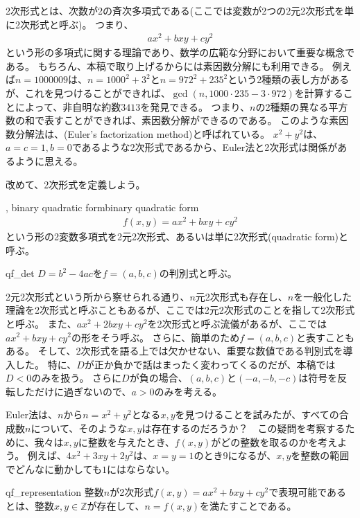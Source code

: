 2次形式とは、次数が2の斉次多項式である(ここでは変数が2つの2元2次形式を単に2次形式と呼ぶ)。
つまり、
\begin{align*}
ax^2 + bxy + cy^2
\end{align*}
という形の多項式に関する理論であり、数学の広範な分野において重要な概念である。
もちろん、本稿で取り上げるからには素因数分解にも利用できる。
例えば$n=1000009$は、$n=1000^2+3^2$と$n=972^2+235^2$という2種類の表し方があるが、これを見つけることができれば、$\gcd(n, 1000\cdot235 - 3\cdot972)$を計算することによって、非自明な約数$3413$を発見できる。
つまり、$n$の2種類の異なる平方数の和で表すことができれば、素因数分解ができるのである。
このような素因数分解法は、(Euler's factorization method)と呼ばれている。
$x^2+y^2$は、$a=c=1,b=0$であるような2次形式であるから、Euler法と2次形式は関係があるように思える。

改めて、2次形式を定義しよう。

\begin{Defi}{, binary quadratic form}{binary quadratic form}
\begin{align*}
f(x,y) = ax^2 + bxy + cy^2
\end{align*}
という形の2変数多項式を2元2次形式、あるいは単に2次形式(quadratic form)と呼ぶ。
\end{Defi}

\begin{Defi}{}{qf_det}
$D=b^2-4ac$を$f=(a,b,c)$の判別式と呼ぶ。
\end{Defi}

2元2次形式という所から察せられる通り、$n$元2次形式も存在し、$n$を一般化した理論を2次形式と呼ぶこともあるが、ここでは2元2次形式のことを指して2次形式と呼ぶ。
また、$ax^2 + 2bxy + cy^2$を2次形式と呼ぶ流儀があるが、ここでは$ax^2 + bxy + cy^2$の形をそう呼ぶ。
さらに、簡単のため$f=(a,b,c)$と表すこともある。
そして、2次形式を語る上では欠かせない、重要な数値である判別式を導入した。
特に、$D$が正か負かで話はまったく変わってくるのだが、本稿では$D<0$のみを扱う。
さらに$D$が負の場合、$(a,b,c)$と$(-a,-b,-c)$は符号を反転しただけに過ぎないので、$a>0$のみを考える。

Euler法は、$n$から$n=x^2+y^2$となる$x,y$を見つけることを試みたが、すべての合成数$n$について、そのような$x,y$は存在するのだろうか？　この疑問を考察するために、我々は$x,y$に整数を与えたとき、$f(x,y)$がどの整数を取るのかを考えよう。
例えば、$4x^2+3xy+2y^2$は、$x=y=1$のとき$9$になるが、$x,y$を整数の範囲でどんなに動かしても$1$にはならない。

\begin{Defi}{}{qf_representation}
整数$n$が2次形式$f(x,y)=ax^2+bxy+cy^2$で表現可能であるとは、整数$x,y\in\mathbb{Z}$が存在して、$n=f(x,y)$を満たすことである。
\end{Defi}

